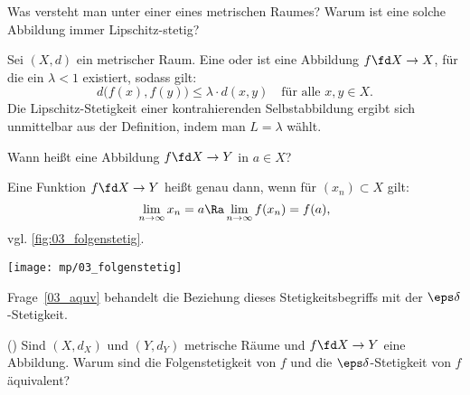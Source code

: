 \begin{frage}\label{03_kont}
  Was versteht man unter einer  
  eines metrischen Raumes? 
  Warum ist eine solche Abbildung immer Lipschitz-stetig?
\end{frage}

\begin{antwort}
  Sei $(X,d)$ ein metrischer Raum. Eine 
   oder 
  ist eine Abbildung $f\fd X\to X$, für die ein $\lambda < 1$ 
  existiert, sodass gilt:
  \[
  d\big( f(x), f(y) \big) \le \lambda \cdot d(x,y)\quad \text{für alle $x,y\in X$}.
  \]
  Die Lipschitz-Stetigkeit einer kontrahierenden Selbstabbildung 
  ergibt sich unmittelbar aus der Definition, 
  indem man $L = \lambda$ wählt. 
  \AntEnd
\end{antwort}

\begin{frage}
  Wann heißt eine Abbildung $f\fd X\to Y$  in $a\in X$?
\end{frage}

\begin{antwort}
  Eine Funktion $f\fd X\to Y$ heißt  
  genau dann, wenn für  $(x_n)\subset X$ gilt: 
  \[
  \lim\limits_{n\to\infty} x_n=a \Ra \lim\limits_{n\to\infty} f(x_n) = f(a),
  \]
  vgl. \Abb\ref{fig:03_folgenstetig}.
  \begin{center}
    \texttt{[image: mp/03\_folgenstetig]}
    \label{fig:03_folgenstetig}
  \end{center}
  Frage~\ref{03_aquv} behandelt die Beziehung  dieses Stetigkeitsbegriffs mit 
  der $\eps\delta$-Stetigkeit. 
  \AntEnd
\end{antwort}

\begin{frage} 
  \label{03_aquv}
  () 
  Sind $(X,d_X)$ und $(Y,d_Y)$ metrische Räume und $f\fd X\to Y$ eine 
  Abbildung. Warum sind die Folgenstetigkeit von $f$ und die 
  $\eps\delta$-Stetigkeit von $f$ äquivalent?
\end{frage}

